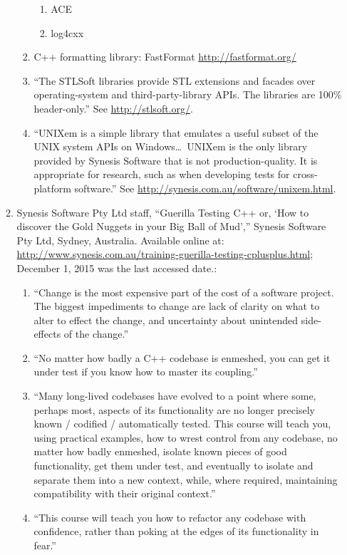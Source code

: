 \begin{enumerate}
\begin{enumerate}
\begin{enumerate}
\begin{enumerate}
			\item ACE
			\item log4cxx
			\end{enumerate}
		\item C++ formatting library: FastFormat \url{http://fastformat.org/}
		\item ``The STLSoft libraries provide STL extensions and facades over operating-system and third-party-library APIs. The libraries are 100\% header-only.'' See \url{http://stlsoft.org/}.
		\item ``UNIXem is a simple library that emulates a useful subset of the UNIX system APIs on Windows\dots\ UNIXem is the only library provided by Synesis Software that is not production-quality. It is appropriate for research, such as when developing tests for cross-platform software.'' See \url{http://synesis.com.au/software/unixem.html}.
		\end{enumerate}
	\item Synesis Software Pty Ltd staff, ``Guerilla Testing C++ or, `How to discover the Gold Nuggets in your Big Ball of Mud','' Synesis Software Pty Ltd, Sydney, Australia.  Available online at: \url{http://www.synesis.com.au/training-guerilla-testing-cplusplus.html}; December 1, 2015 was the last accessed date.: \vspace{-0.2cm}
		\begin{enumerate} \itemsep -2pt
		\item ``Change is the most expensive part of the cost of a software project. The biggest impediments to change are lack of clarity on what to alter to effect the change, and uncertainty about unintended side-effects of the change.''
		\item ``No matter how badly a C++ codebase is enmeshed, you can get it under test if you know how to master its coupling.''
		\item ``Many long-lived codebases have evolved to a point where some, perhaps most, aspects of its functionality are no longer precisely known / codified / automatically tested. This course will teach you, using practical examples, how to wrest control from any codebase, no matter how badly enmeshed, isolate known pieces of good functionality, get them under test, and eventually to isolate and separate them into a new context, while, where required, maintaining compatibility with their original context.''
		\item ``This course will teach you how to refactor any codebase with confidence, rather than poking at the edges of its functionality in fear.''

\end{enumerate}
\end{enumerate}
\end{enumerate}
